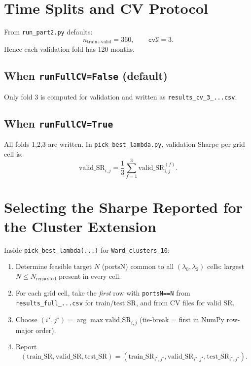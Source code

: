 ﻿\documentclass[11pt]{article}
\begin{document}
\section{Time Splits and CV Protocol}
From \texttt{run\_part2.py} defaults:
\[
n_{\text{train+valid}}=360,\qquad \texttt{cvN}=3.
\]
Hence each validation fold has 120 months.

\subsection*{When \texttt{runFullCV=False} (default)}
Only fold 3 is computed for validation and written as \texttt{results\_cv\_3\_...csv}.

\subsection*{When \texttt{runFullCV=True}}
All folds 1,2,3 are written. In \texttt{pick\_best\_lambda.py}, validation Sharpe per grid cell is:
\[
\mathrm{valid\_SR}_{i,j}=\frac{1}{3}\sum_{f=1}^3\mathrm{valid\_SR}_{i,j}^{(f)}.
\]

\section{Selecting the Sharpe Reported for the Cluster Extension}
Inside \texttt{pick\_best\_lambda(...)} for \texttt{Ward\_clusters\_10}:
\begin{enumerate}[label=\textbf{P\arabic*.}]
  \item Determine feasible target $N$ (portsN) common to all $(\lambda_0,\lambda_2)$ cells:
  largest $N\le N_{\text{requested}}$ present in every cell.
  \item For each grid cell, take the \emph{first} row with \texttt{portsN==N} from
  \texttt{results\_full\_...csv} for train/test SR,
  and from CV files for valid SR.
  \item Choose $(i^\star,j^\star)=\arg\max\mathrm{valid\_SR}_{i,j}$
  (tie-break = first in NumPy row-major order).
  \item Report
  \[
  (\mathrm{train\_SR},\mathrm{valid\_SR},\mathrm{test\_SR})
  =(\mathrm{train\_SR}_{i^\star,j^\star},\mathrm{valid\_SR}_{i^\star,j^\star},\mathrm{test\_SR}_{i^\star,j^\star}).
  \]
\end{enumerate}
\end{document}
